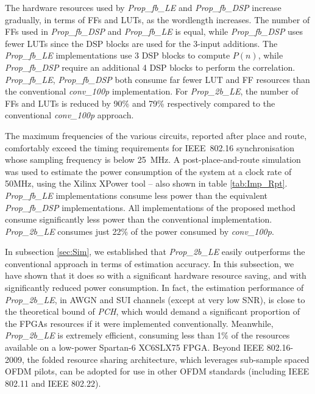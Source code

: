 The hardware resources used by \emph{Prop\_fb\_LE} and \emph{Prop\_fb\_DSP} increase gradually, in terms of FFs and LUTs, as the wordlength increases.
The number of FFs used in \emph{Prop\_fb\_DSP} and \emph{Prop\_fb\_LE} is equal, while \emph{Prop\_fb\_DSP} uses fewer LUTs since the DSP blocks are used for the 3-input additions.
The \emph{Prop\_fb\_LE} implementations use 3 DSP blocks to compute $P(n)$, while \emph{Prop\_fb\_DSP} require an additional 4 DSP blocks to perform the correlation.
\emph{Prop\_fb\_LE}, \emph{Prop\_fb\_DSP} both consume far fewer LUT and FF resources than the conventional \emph{conv\_100p} implementation.
For \emph{Prop\_2b\_LE}, the number of FFs and LUTs is reduced by 90\% and 79\% respectively compared to the conventional \emph{conv\_100p} approach.

The maximum frequencies of the various circuits, reported after place and route, comfortably exceed the timing requirements for IEEE~802.16 synchronisation whose sampling frequency is below 25~MHz.
A post-place-and-route simulation was used to estimate the power consumption of the system at a clock rate of 50{\thinspace}MHz, using the Xilinx XPower tool -- also shown in table \ref{tab:Imp_Rpt}.
\emph{Prop\_fb\_LE} implementations consume less power than the equivalent \emph{Prop\_fb\_DSP} implementations.
All implementations of the proposed method consume significantly less power than the conventional implementation.
\emph{Prop\_2b\_LE} consumes just 22\% of the power consumed by \emph{conv\_100p}.

In subsection \ref{sec:Sim}, we established that \emph{Prop\_2b\_LE} easily outperforms the conventional approach in terms of estimation accuracy.
In this subsection, we have shown that it does so with a significant hardware resource saving, and with significantly reduced power consumption.
In fact, the estimation performance of \emph{Prop\_2b\_LE}, in AWGN and SUI channels (except at very low SNR), is close to the theoretical bound of \emph{PCH}, which would demand a significant proportion of the FPGAs resources if it were implemented conventionally.
Meanwhile, \emph{Prop\_2b\_LE} is extremely efficient, consuming less than 1\% of the resources available on a low-power Spartan-6 XC6SLX75 FPGA.
Beyond IEEE 802.16-2009, the folded resource sharing architecture, which leverages sub-sample spaced OFDM pilots, can be adopted for use in other OFDM standards (including IEEE 802.11 and IEEE 802.22).

